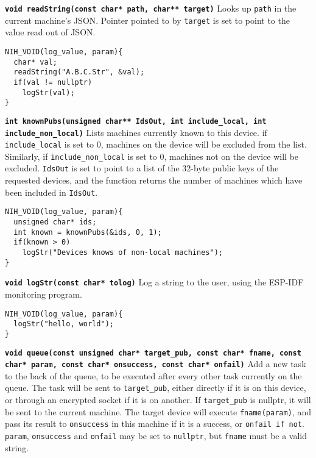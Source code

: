 \documentclass{article}
\begin{document}
\textbf{\texttt{void readString(const char* path, char** target)}}\newline
Looks up \texttt{path} in the current machine's JSON. Pointer pointed to by \texttt{target} is set to point to the value read out of JSON.

\begin{tcolorbox}[colback=white,grow to left by=2.5mm,grow to right by=2.5mm,left*=0mm,right*=0mm,sharp corners]
\begin{verbatim}
NIH_VOID(log_value, param){
  char* val;
  readString("A.B.C.Str", &val);
  if(val != nullptr)
    logStr(val);
}
\end{verbatim}
\end{tcolorbox}

\textbf{\texttt{int knownPubs(unsigned char** IdsOut, int include\_local, int include\_non\_local)}}\newline
Lists machines currently known to this device. if \texttt{include\_local} is set to 0, machines on the device will be excluded from the list. Similarly, if \texttt{include\_non\_local} is set to 0, machines not on the device will be excluded. \texttt{IdsOut} is set to point to a list of the 32-byte public keys of the requested devices, and the function returns the number of machines which have been included in \texttt{IdsOut}.

\begin{tcolorbox}[colback=white,grow to left by=2.5mm,grow to right by=2.5mm,left*=0mm,right*=0mm,sharp corners]
\begin{verbatim}
NIH_VOID(log_value, param){
  unsigned char* ids;
  int known = knownPubs(&ids, 0, 1);
  if(known > 0)
    logStr("Devices knows of non-local machines");
}
\end{verbatim}
\end{tcolorbox}

\textbf{\texttt{void logStr(const char* tolog)}}\newline
Log a string to the user, using the ESP-IDF monitoring program.

\begin{tcolorbox}[colback=white,grow to left by=2.5mm,grow to right by=2.5mm,left*=0mm,right*=0mm,sharp corners]
\begin{verbatim}
NIH_VOID(log_value, param){
  logStr("hello, world");
}
\end{verbatim}
\end{tcolorbox}

\textbf{\texttt{void queue(const unsigned char* target\_pub, const char* fname, const char* param, const char* onsuccess, const char* onfail)}}\newline
Add a new task to the back of the queue, to be executed after every other task currently on the queue. The task will be sent to \texttt{target\_pub}, either directly if it is on this device, or through an encrypted socket if it is on another. If \texttt{target\_pub} is nullptr, it will be sent to the current machine. The target device will execute \texttt{fname(param)}, and pass its result to \texttt{onsuccess} in this machine if it is a success, or \texttt{onfail if not}. \texttt{param}, \texttt{onsuccess} and \texttt{onfail} may be set to \texttt{nullptr}, but \texttt{fname} must be a valid string.
\end{document}
